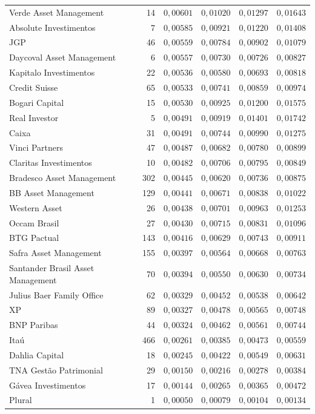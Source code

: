 \documentclass[11pt,a4paper]{article}
\begin{document}
\begin{center}
\begin{longtable}{@{}lrrrrr@{}}
Verde Asset Management & 14 & $0{,}00601$ & $0{,}01020$ & $0{,}01297$ & $0{,}01643$ \\
Absolute Investimentos & 7 & $0{,}00585$ & $0{,}00921$ & $0{,}01220$ & $0{,}01408$ \\
JGP & 46 & $0{,}00559$ & $0{,}00784$ & $0{,}00902$ & $0{,}01079$ \\
Daycoval Asset Management & 6 & $0{,}00557$ & $0{,}00730$ & $0{,}00726$ & $0{,}00827$ \\
Kapitalo Investimentos & 22 & $0{,}00536$ & $0{,}00580$ & $0{,}00693$ & $0{,}00818$ \\
Credit Suisse & 65 & $0{,}00533$ & $0{,}00741$ & $0{,}00859$ & $0{,}00974$ \\
Bogari Capital & 15 & $0{,}00530$ & $0{,}00925$ & $0{,}01200$ & $0{,}01575$ \\
Real Investor & 5 & $0{,}00491$ & $0{,}00919$ & $0{,}01401$ & $0{,}01742$ \\
Caixa & 31 & $0{,}00491$ & $0{,}00744$ & $0{,}00990$ & $0{,}01275$ \\
Vinci Partners & 47 & $0{,}00487$ & $0{,}00682$ & $0{,}00780$ & $0{,}00899$ \\
Claritas Investimentos & 10 & $0{,}00482$ & $0{,}00706$ & $0{,}00795$ & $0{,}00849$ \\
Bradesco Asset Management & 302 & $0{,}00445$ & $0{,}00620$ & $0{,}00736$ & $0{,}00875$ \\
BB Asset Management & 129 & $0{,}00441$ & $0{,}00671$ & $0{,}00838$ & $0{,}01022$ \\
Western Asset & 26 & $0{,}00438$ & $0{,}00701$ & $0{,}00963$ & $0{,}01253$ \\
Occam Brasil & 27 & $0{,}00430$ & $0{,}00715$ & $0{,}00831$ & $0{,}01096$ \\
BTG Pactual & 143 & $0{,}00416$ & $0{,}00629$ & $0{,}00743$ & $0{,}00911$ \\
Safra Asset Management & 155 & $0{,}00397$ & $0{,}00564$ & $0{,}00668$ & $0{,}00763$ \\
Santander Brasil Asset Management & 70 & $0{,}00394$ & $0{,}00550$ & $0{,}00630$ & $0{,}00734$ \\
Julius Baer Family Office & 62 & $0{,}00329$ & $0{,}00452$ & $0{,}00538$ & $0{,}00642$ \\
XP & 89 & $0{,}00327$ & $0{,}00478$ & $0{,}00565$ & $0{,}00748$ \\
BNP Paribas & 44 & $0{,}00324$ & $0{,}00462$ & $0{,}00561$ & $0{,}00744$ \\
Itaú & 466 & $0{,}00261$ & $0{,}00385$ & $0{,}00473$ & $0{,}00559$ \\
Dahlia Capital & 18 & $0{,}00245$ & $0{,}00422$ & $0{,}00549$ & $0{,}00631$ \\
TNA Gestão Patrimonial & 29 & $0{,}00150$ & $0{,}00216$ & $0{,}00278$ & $0{,}00384$ \\
Gávea Investimentos & 17 & $0{,}00144$ & $0{,}00265$ & $0{,}00365$ & $0{,}00472$ \\
Plural & 1 & $0{,}00050$ & $0{,}00079$ & $0{,}00104$ & $0{,}00134$ \\
\end{longtable}
\end{center}
\end{document}
